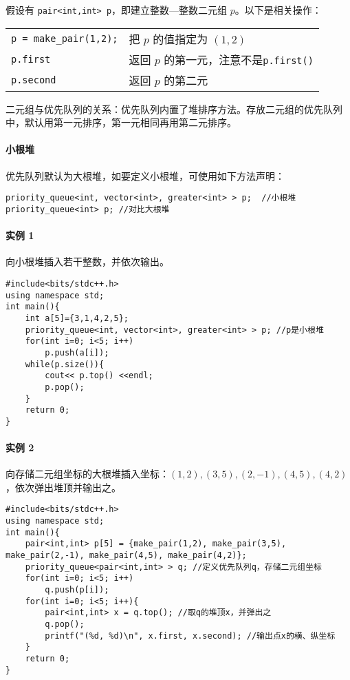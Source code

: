 \documentclass[UTF8]{ctexart}
\begin{document}
假设有 \verb!pair<int,int> p!，即建立整数—整数二元组 $p$。以下是相关操作：
\begin{table}[H]
  \centering
  \begin{tabular}{ll}
    \verb!p = make_pair(1,2);! & 把 $p$ 的值指定为 $(1,2)$ \\
    \verb!p.first! & 返回 $p$ 的第一元，注意不是\verb!p.first()!  \\
    \verb!p.second! & 返回 $p$ 的第二元 \\
  \end{tabular}
\end{table}

二元组与优先队列的关系：优先队列内置了堆排序方法。存放二元组的优先队列中，默认用第一元排序，第一元相同再用第二元排序。

\paragraph{小根堆} 优先队列默认为大根堆，如要定义小根堆，可使用如下方法声明：
\begin{lstlisting}[numbers=none]
priority_queue<int, vector<int>, greater<int> > p;  //小根堆
priority_queue<int> p; //对比大根堆
\end{lstlisting}

\paragraph{实例 1} 向小根堆插入若干整数，并依次输出。
\begin{lstlisting}
#include<bits/stdc++.h>
using namespace std;
int main(){
	int a[5]={3,1,4,2,5};
	priority_queue<int, vector<int>, greater<int> > p; //p是小根堆
	for(int i=0; i<5; i++)
		p.push(a[i]);
	while(p.size()){
		cout<< p.top() <<endl;
		p.pop();
	}
	return 0;
}
\end{lstlisting}

\paragraph{实例 2} 向存储二元组坐标的大根堆插入坐标：$(1,2),(3,5),(2,-1),(4,5),(4,2)$，依次弹出堆顶并输出之。
\begin{lstlisting}
#include<bits/stdc++.h>
using namespace std;
int main(){
	pair<int,int> p[5] = {make_pair(1,2), make_pair(3,5), make_pair(2,-1), make_pair(4,5), make_pair(4,2)};
	priority_queue<pair<int,int> > q; //定义优先队列q，存储二元组坐标
	for(int i=0; i<5; i++)
		q.push(p[i]);
	for(int i=0; i<5; i++){
		pair<int,int> x = q.top(); //取q的堆顶x，并弹出之
		q.pop();
		printf("(%d, %d)\n", x.first, x.second); //输出点x的横、纵坐标
	}
	return 0;
}
\end{lstlisting}
\end{document}
